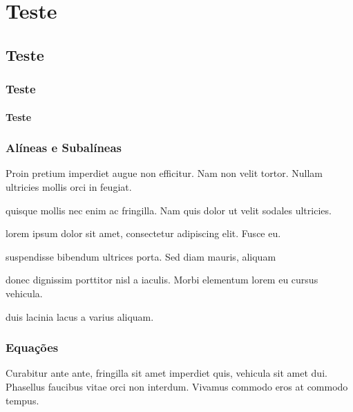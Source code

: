 \documentclass{uecetex}
\begin{document}
	
	\imprimirlistadefiguras
	\imprimirlistadetabelas
	\imprimirlistadequadros
	
	
	\chapter{Teste}	\lipsum[1]	
	\section{Teste}	\lipsum[1]
	\subsection{Teste}	\lipsum[1]
	\subsubsection{Teste}	\lipsum[1]
		\lipsum[1]
	
	\blindtext
	\subsection{Alíneas e Subalíneas}
	
	Proin pretium imperdiet augue non efficitur. Nam non velit tortor. Nullam ultricies mollis orci in feugiat.	
	
	\begin{alineas}
		\item quisque mollis nec enim ac fringilla. Nam quis dolor ut velit sodales ultricies.
		\item lorem ipsum dolor sit amet, consectetur adipiscing elit. Fusce eu.
		\begin{subalineas}
			\item suspendisse bibendum ultrices porta. Sed diam mauris, aliquam
			\item donec dignissim porttitor nisl a iaculis. Morbi elementum lorem eu cursus vehicula.
		\end{subalineas}
		\item duis lacinia lacus a varius aliquam. 
	\end{alineas}
	
	\subsection{Equações}

	Curabitur ante ante, fringilla sit amet imperdiet quis, vehicula sit amet dui. Phasellus faucibus vitae orci non interdum. Vivamus commodo eros at commodo tempus.
\end{document}
